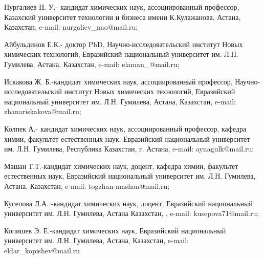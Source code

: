 \begin{noparindent}
Нургалиев Н. У.- кандидат химических наук, ассоциированный профессор,
Казахский университет технологии и бизнеса имени К.Кулажанова, Астана,
Казахстан, e-mail: nurgaliev\_nao@mail.ru;

Айбульдинов Е.К.- доктор PhD, Научно-исследовательский институт Новых
химических технологий, Евразийский национальный университет им. Л.Н.
Гумилева, Астана, Казахстан, e-mail: elaman\_@mail.ru;

Искакова Ж. Б.-кандидат химических наук, ассоциированный профессор,
Научно-исследовательский институт Новых химических технологий,
Евразийский национальный университет им. Л.Н. Гумилева, Астана,
Казахстан, e-mail: zhanariskakova@mail.ru;

Колпек А.- кандидат химических наук, ассоциированный профессор, кафедра
химии, факультет естественных наук, Евразийский национальный университет
им. Л.Н. Гумилева, Республика Казахстан, г. Астана, e-mail:
aynagulk@mail.ru;

Машан Т.Т.-кандидат химических наук, доцент, кафедра химии, факультет
естественных наук, Евразийский национальный университет им. Л.Н.
Гумилева, Астана, Казахстан, e-mail: togzhan-mashan@mail.ru;

Кусепова Л.А. -кандидат химических наук, доцент, Евразийский
национальный университет им. Л.Н. Гумилева, Астана Казахстан, , e-mail:
kusepova71@mail.ru;

Копишев Э. Е.-кандидат химических наук, Евразийский национальный
университет им. Л.Н. Гумилева, Астана, Казахстан, e-mail:
eldar\_kopishev@mail.ru
\end{noparindent}

